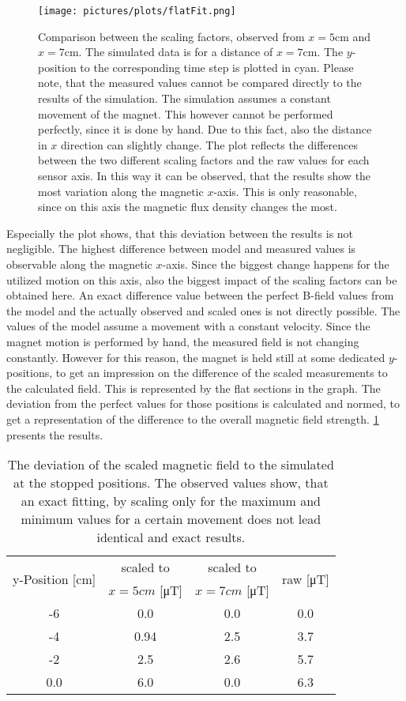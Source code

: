 \begin{figure}[h]
\texttt{[image: pictures/plots/flatFit.png]}
\caption{Comparison between the scaling factors, observed from $ x=5\si{\cm} $ and $ x=7\si{\cm} $. The simulated data is for a distance of $ x=7\si{\cm} $. The $ y $-position to the corresponding time step is plotted in cyan. Please note, that the measured values cannot be compared directly to the results of the simulation. The simulation assumes a constant movement of the magnet. This however cannot be performed perfectly, since it is done by hand. Due to this fact, also the distance in $ x $ direction can slightly change. The plot reflects the differences between the two different scaling factors and the raw values for each sensor axis. In this way it can be observed, that the results show the most variation along the magnetic $ x $-axis. This is only reasonable, since on this axis the magnetic flux density changes the most.}
\label{fig:flatFit}
\end{figure}
Especially the plot shows, that this deviation between the results is not negligible. The highest difference between model and measured values is observable along the magnetic $ x $-axis. Since the biggest change happens for the utilized motion on this axis, also the biggest impact of the scaling factors can be obtained here. An exact difference value between the perfect B-field values from the model and the actually observed and scaled ones is not directly possible. The values of the model assume a movement with a constant velocity. Since the magnet motion is performed by hand, the measured field is not changing constantly. However for this reason, the magnet is held still at some dedicated $ y $-positions, to get an impression on the difference of the scaled measurements to the calculated field. This is represented by the flat sections in the graph. The deviation from the perfect values for those positions is calculated and normed, to get a representation of the difference to the overall magnetic field strength. \ref{tab:diffScaled} presents the results.
\begin{table}[h!]
\centering
\begin{tabular}{c c c c}
\toprule
\multirow{2}{*}{y-Position [\si{cm}]} & scaled to  & scaled to  & \multirow{2}{*}{raw [\si{\micro \tesla}]} \\ 
 & $ x=5\si{cm} $ [\si{\micro \tesla}] & $ x=7\si{cm} $ [\si{\micro \tesla}]  & \\ \midrule
-6    & 0.0  &  0.0  & 0.0 	\\ 
-4    &	0.94 &  2.5  & 3.7 	\\ 
-2    &	2.5  &  2.6  & 5.7 	\\ 
0.0	  &	6.0  &  0.0  & 6.3 	\\ \bottomrule
\end{tabular}
\caption{The deviation of the scaled magnetic field to the simulated at the stopped positions. The observed values show, that an exact fitting, by scaling only for the maximum and minimum values for a certain movement does not lead identical and exact results.}
\label{tab:diffScaled}
\end{table}
